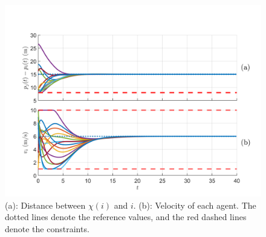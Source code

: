 \documentclass[letterpaper, 10 pt, conference]{ieeeconf}  %
\begin{document}
{

\begin{figure}
    \centering
    \includegraphics[width=\linewidth]{Simulations/pos_velocity_dist_to_Xf.png}
    \caption{(a): Distance between $\chi(i)$ and $i$. (b): Velocity of each agent. The dotted lines denote the reference values, and the red dashed lines denote the constraints. }
    \label{fig:simulation_result}
\end{figure}

}
\end{document}
